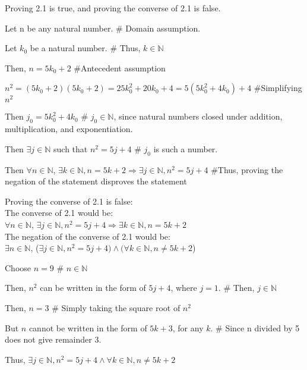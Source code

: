 \documentclass{article}
\begin{document}
\begin{enumerate}
\item Proving 2.1 is true, and proving the converse of 2.1 is false.
				\item Then $\forall n \in \mathbb{N}$, $\exists k \in \mathbb{N}, n = 5k+2 \Rightarrow \exists j \in \mathbb{N}, n^2 = 5j+4$ \#Thus, proving the negation of the statement disproves the statement
		\end {description}

Proving the converse of 2.1 is false:\\
The converse of 2.1 would be:\\
$\forall n \in \mathbb{N}$, $\exists j \in \mathbb{N}, n^2 = 5j+4 \Rightarrow \exists k \in \mathbb{N}, n = 5k+2$\\
The negation of the converse of 2.1 would be:\\
$\exists n \in \mathbb{N}$, ($\exists j \in \mathbb{N}, n^2 = 5j+4) \wedge (\forall k \in \mathbb{N}, n \neq 5k+2$)
		\begin {description}
				\item Choose $n = 9$ \# $n \in \mathbb{N}$
				\item Then, $n^2$ can be written in the form of $5j + 4$, where $j = 1$. \# Then, $j \in \mathbb{N}$
				\item Then, $n = 3$ \# Simply taking the square root of $n^2$
				\item But $n$ cannot be written in the form of $5k + 3$, for any $k$. \# Since n divided by 5 does not give remainder 3.
				\item Thus, $\exists j \in \mathbb{N}, n^2 = 5j+4 \wedge\forall k \in \mathbb{N}, n \neq 5k+2$


\end{description}
\end{enumerate}
\end{document}
